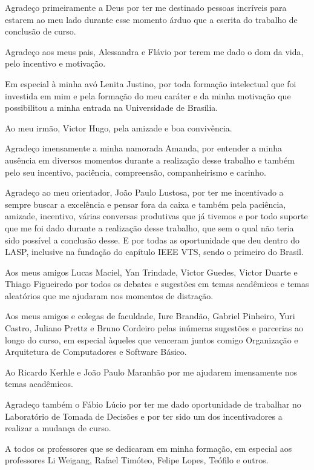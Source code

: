 Agradeço primeiramente a Deus por ter me destinado pessoas incríveis para estarem ao meu lado 
durante esse momento árduo que a escrita do trabalho de conclusão de curso. 

Agradeço aos meus pais, Alessandra e Flávio por terem me dado o dom da vida, pelo incentivo e motivação.

Em especial à minha avó Lenita Justino, por toda formação 
intelectual que foi investida em mim e pela formação do meu caráter e da minha motivação que possibilitou 
a minha entrada na Universidade de Brasília.

Ao meu irmão, Victor Hugo, pela amizade e boa convivência.

Agradeço imensamente a minha namorada Amanda, por entender a minha ausência em diversos momentos durante a realização desse trabalho
e também pelo seu incentivo, paciência, compreensão, companheirismo e carinho.

Agradeço ao meu orientador, João Paulo Lustosa, por ter me incentivado a sempre buscar a excelência e pensar fora da caixa e também
pela paciência, amizade, incentivo, várias conversas produtivas que já tivemos e por todo suporte que me foi dado durante a realização desse 
trabalho, que sem o qual não teria sido possível a conclusão desse. E por todas as oportunidade que deu dentro do LASP, inclusive na fundação 
do capítulo IEEE VTS, sendo o primeiro do Brasil.

Aos meus amigos Lucas Maciel, Yan Trindade, Victor Guedes, Victor Duarte e Thiago Figueiredo por todos os debates e sugestões em temas acadêmicos 
e temas aleatórios que me ajudaram nos momentos de distração.

Aos meus amigos e colegas de faculdade, Iure Brandão, Gabriel Pinheiro, Yuri Castro, Juliano Prettz e 
Bruno Cordeiro pelas inúmeras sugestões e parcerias ao longo do curso, em especial àqueles que venceram juntos comigo Organização e Arquitetura
de Computadores e Software Básico.

Ao Ricardo Kerhle e João Paulo Maranhão por me ajudarem imensamente nos temas acadêmicos. 

Agradeço também o Fábio Lúcio por ter me dado oportunidade de trabalhar no Laboratório de Tomada de Decisões e por ter sido um
dos incentivadores a realizar a mudança de curso.

A todos os professores que se dedicaram em minha formação, em especial aos professores Li Weigang, Rafael Timóteo, Felipe Lopes, Teófilo e outros.

